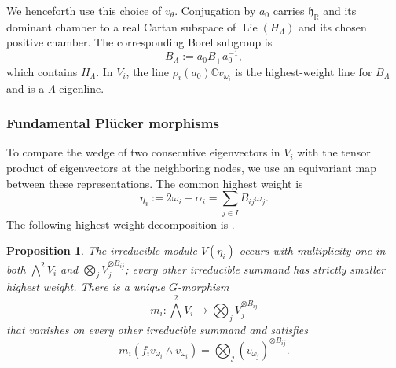 \documentclass[11pt,leqno]{amsart}
\numberwithin{equation}{section}
\theoremstyle{plain}
\newtheorem{proposition}[theorem]{Proposition}
\theoremstyle{definition}
\theoremstyle{plain}
\theoremstyle{definition}
\theoremstyle{remark}
\newcommand{\gh}{\mathfrak h}
\begin{document}
We henceforth use this choice of $v_\theta$.  Conjugation by $a_0$ carries $\gh_{\mathbb R}$ and its dominant chamber to a real Cartan subspace of $\operatorname{Lie}(H_\Lambda)$ and its chosen positive chamber.  The corresponding Borel subgroup is
\[
 B_\Lambda:=a_0B_+a_0^{-1},
\]
which contains $H_\Lambda$.  In $V_i$, the line $\rho_i(a_0)\mathbb Cv_{\omega_i}$ is the highest-weight line for $B_\Lambda$ and is a $\Lambda$-eigenline.

\subsubsection{Fundamental Pl\"ucker morphisms}
To compare the wedge of two consecutive eigenvectors in $V_i$ with the tensor product of eigenvectors at the neighboring nodes, we use an equivariant map between these representations.  The common highest weight is
\begin{equation}\label{eq:eta-i}
 \eta_i:=2\omega_i-\alpha_i
 =\sum_{j\in I}B_{ij}\omega_j.
\end{equation}
The following highest-weight decomposition is
\cite[Lemmas~1.1--1.2 and equation~(1.4)]{MRV2016}.
\begin{proposition}\label{prop:fundamental-Plucker-morphisms}
The irreducible module $V(\eta_i)$ occurs with multiplicity one in both
$\bigwedge^2V_i$ and $\bigotimes_jV_j^{\otimes B_{ij}}$; every other
irreducible summand has strictly smaller highest weight.  There is a
unique $G$-morphism
\begin{equation}\label{eq:mi-finite}
 m_i:\bigwedge^2V_i\longrightarrow
       \bigotimes_jV_j^{\otimes B_{ij}}
\end{equation}
that vanishes on every other irreducible summand and satisfies
\begin{equation}\label{eq:mi-highest-normalization}
 m_i(f_iv_{\omega_i}\wedge v_{\omega_i})
   =\bigotimes_j(v_{\omega_j})^{\otimes B_{ij}}.
\end{equation}
\end{proposition}
\end{document}
